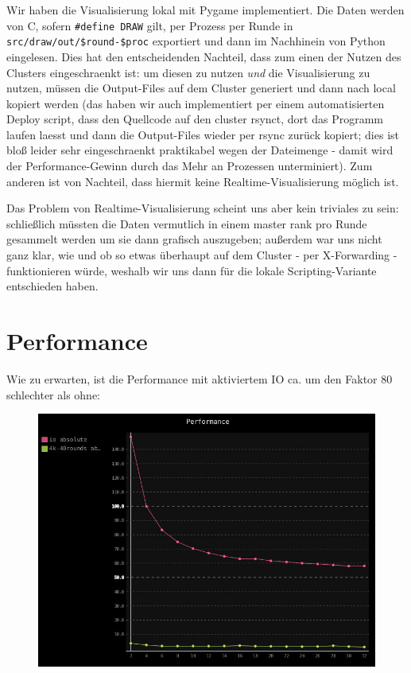 Wir haben die Visualisierung lokal mit Pygame implementiert. Die Daten
werden von C, sofern \texttt{\#define DRAW} gilt, per Prozess per Runde
in \texttt{src/draw/out/\$round-\$proc} exportiert und dann im
Nachhinein von Python eingelesen. Dies hat den entscheidenden Nachteil,
dass zum einen der Nutzen des Clusters eingeschraenkt ist: um diesen zu
nutzen \emph{und} die Visualisierung zu nutzen, müssen die Output-Files
auf dem Cluster generiert und dann nach local kopiert werden (das haben
wir auch implementiert per einem automatisierten Deploy script, dass den
Quellcode auf den cluster rsynct, dort das Programm laufen laesst und
dann die Output-Files wieder per rsync zurück kopiert; dies ist bloß
leider sehr eingeschraenkt praktikabel wegen der Dateimenge - damit wird
der Performance-Gewinn durch das Mehr an Prozessen unterminiert). Zum
anderen ist von Nachteil, dass hiermit keine Realtime-Visualisierung
möglich ist.

Das Problem von Realtime-Visualisierung scheint uns aber kein triviales
zu sein: schließlich müssten die Daten vermutlich in einem master rank
pro Runde gesammelt werden um sie dann grafisch auszugeben; außerdem war
uns nicht ganz klar, wie und ob so etwas überhaupt auf dem Cluster - per
X-Forwarding - funktionieren würde, weshalb wir uns dann für die lokale
Scripting-Variante entschieden haben.

\section{Performance}\label{performance}

Wie zu erwarten, ist die Performance mit aktiviertem IO ca. um den
Faktor 80 schlechter als ohne:

\begin{figure}[htbp]
\centering
\includegraphics{pics/io-vs-no-io absolute.jpg}
\end{figure}

